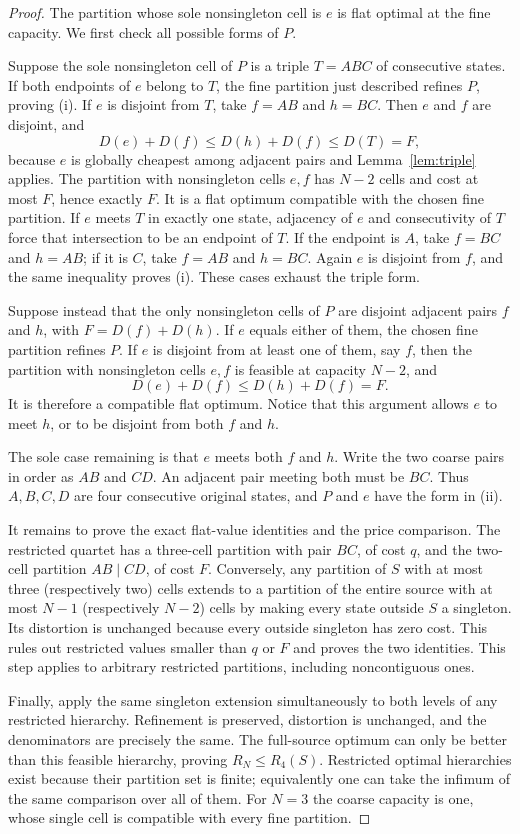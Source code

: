 \begin{proof}
The partition whose sole nonsingleton cell is $e$ is flat optimal at the
fine capacity. We first check all possible forms of $P$.

Suppose the sole nonsingleton cell of $P$ is a triple $T=ABC$ of consecutive
states. If both endpoints of $e$ belong to $T$, the fine partition just
described refines $P$, proving (i). If $e$ is disjoint from $T$, take
$f=AB$ and $h=BC$. Then $e$ and $f$ are disjoint, and
\[
 D(e)+D(f)\le D(h)+D(f)\le D(T)=F,
\]
because $e$ is globally cheapest among adjacent pairs and
Lemma~\ref{lem:triple} applies. The partition with nonsingleton cells
$e,f$ has $N-2$ cells and cost at most $F$, hence exactly $F$. It is a
flat optimum compatible with the chosen fine partition. If $e$ meets
$T$ in exactly one state, adjacency of $e$ and consecutivity of $T$
force that intersection to be an endpoint of $T$. If the endpoint is
$A$, take $f=BC$ and $h=AB$; if it is $C$, take $f=AB$ and $h=BC$.
Again $e$ is disjoint from $f$, and the same inequality proves (i).
These cases exhaust the triple form.

Suppose instead that the only nonsingleton cells of $P$ are disjoint
adjacent pairs $f$ and $h$, with $F=D(f)+D(h)$. If $e$ equals either of
them, the chosen fine partition refines $P$. If $e$ is disjoint from at
least one of them, say $f$, then the partition with nonsingleton cells
$e,f$ is feasible at capacity $N-2$, and
\[
 D(e)+D(f)\le D(h)+D(f)=F.
\]
It is therefore a compatible flat optimum. Notice that this argument
allows $e$ to meet $h$, or to be disjoint from both $f$ and $h$.

The sole case remaining is that $e$ meets both $f$ and $h$. Write the two
coarse pairs in order as $AB$ and $CD$. An adjacent pair meeting both
must be $BC$. Thus $A,B,C,D$ are four consecutive original states,
and $P$ and $e$ have the form in (ii).

It remains to prove the exact flat-value identities and the price
comparison. The restricted quartet has a three-cell partition with pair
$BC$, of cost $q$, and the two-cell partition $AB\mid CD$, of cost $F$.
Conversely, any partition of $S$ with at most three (respectively two)
cells extends to a partition of the entire source with at most $N-1$
(respectively $N-2$) cells by making every state outside $S$ a singleton.
Its distortion is unchanged because every outside singleton has zero
cost. This rules out restricted values smaller than $q$ or $F$ and proves
the two identities. This step applies to arbitrary restricted partitions,
including noncontiguous ones.

Finally, apply the same singleton extension simultaneously to both levels
of any restricted hierarchy. Refinement is preserved, distortion is
unchanged, and the denominators are precisely the same. The full-source
optimum can only be better than this feasible hierarchy, proving
$R_N\le R_4(S)$. Restricted optimal hierarchies exist because their
partition set is finite; equivalently one can take the infimum of the
same comparison over all of them. For $N=3$ the coarse capacity is one,
whose single cell is compatible with every fine partition.
\end{proof}

